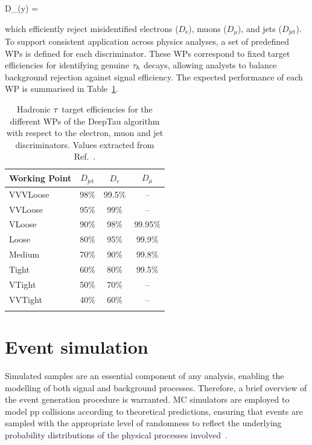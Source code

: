 \begin{equation_pad}
    D_\alpha(y) =  
\end{equation_pad}

which efficiently reject misidentified electrons ($D_\text{e}$), muons ($D_\mu$), and jets ($D_\text{jet}$). To support consistent application across physics analyses, a set of predefined WPs is defined for each discriminator. These \acp{WP} correspond to fixed target efficiencies for identifying genuine $\tau_h$ decays, allowing analysts to balance background rejection against signal efficiency. The expected performance of each \ac{WP} is summarised in Table~\ref{Table:Chapter4_DeepTau_WPs}.

\begin{table}[htbp]
\centering
\renewcommand{\arraystretch}{1.5} %
\begin{tabular}{|l|c|c|c|}
\hline
Working Point & $D_{\text{jet}}$ & $D_e$ & $D_\mu$ \\
\hline \hline
VVVLoose & 98\% & 99.5\% & -- \\
\arrayrulecolor{lightgray} \hline
VVLoose  & 95\% & 99\%   & -- \\
\arrayrulecolor{lightgray} \hline
VLoose   & 90\% & 98\%   & 99.95\% \\
\arrayrulecolor{lightgray} \hline
Loose    & 80\% & 95\%   & 99.9\% \\
\arrayrulecolor{lightgray} \hline
Medium   & 70\% & 90\%   & 99.8\% \\
\arrayrulecolor{lightgray} \hline
Tight    & 60\% & 80\%   & 99.5\% \\
\arrayrulecolor{lightgray} \hline
VTight   & 50\% & 70\%   & -- \\
\arrayrulecolor{lightgray} \hline
VVTight  & 40\% & 60\%   & -- \\
\arrayrulecolor{lightgray} \hline
\arrayrulecolor{black} \hline
\end{tabular}
\caption[Hadronic tau target efficiencies for the different working points of the DeepTau algorithm with respect to the electron, muon and jet discriminators]{Hadronic $\tau$ target efficiencies for the different WPs of the DeepTau algorithm with respect to the electron, muon and jet discriminators. Values extracted from Ref.~\cite{DeepTau_20-001}.}
\label{Table:Chapter4_DeepTau_WPs}
\end{table}

\section{Event simulation}
\label{Section:Chapter4_EventSimulation}
Simulated samples are an essential component of any analysis, enabling the modelling of both signal and background processes. Therefore, a brief overview of the event generation procedure is warranted. \ac{MC} simulators are employed to model pp collisions according to theoretical predictions, ensuring that events are sampled with the appropriate level of randomness to reflect the underlying probability distributions of the physical processes involved~\cite{PYTHIA,EventGenerators}.

